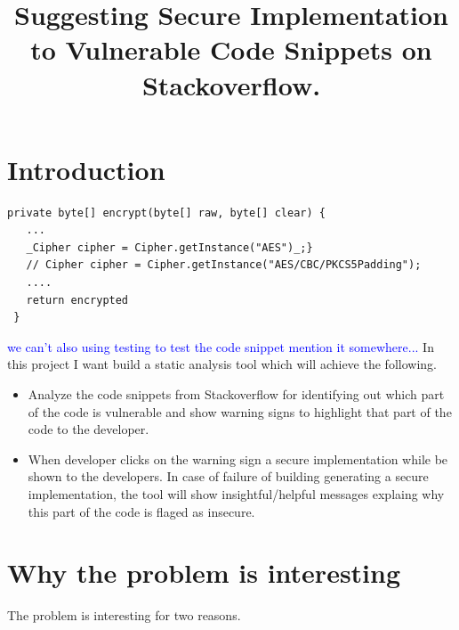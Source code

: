 \documentclass[sigconf]{acmart}
\newcommand{\note}[1]{\begin{noteBox} \textbf{Note:} #1 \end{noteBox}}
\begin{document}
\title{Suggesting Secure Implementation to Vulnerable Code Snippets on Stackoverflow.}


\maketitle
\section{Introduction}
\begin{lstlisting}[caption={A real code snippet taken from Stackoverflow. I want to build a tool which after analyzing the code snippet will highlight the part of the code that is insecure and suggest an alternative secure implementation as showed in the figure.}, label={fig:motivating-example}]
 private byte[] encrypt(byte[] raw, byte[] clear) {
   ...
   _Cipher cipher = Cipher.getInstance("AES")_;}
   // Cipher cipher = Cipher.getInstance("AES/CBC/PKCS5Padding");
   ....
   return encrypted
 }
  \end{lstlisting}
\label{into}
\textcolor{blue}{we can't also using testing to test the code snippet mention it somewhere...}
In this project I want build a static analysis tool which will achieve the following. 
\begin{itemize}
\item  Analyze the code snippets from Stackoverflow for identifying out which part of the code is vulnerable and show warning signs to highlight that part of the code to the developer.
\item When developer clicks on the warning sign a secure implementation while be shown to the developers. In case of failure of building generating a secure implementation, the tool will show insightful/helpful messages explaing why this part of the code is flaged as insecure.  
\end{itemize}

\section{Why the problem is interesting}
The problem is interesting for two reasons. 
\end{document}
